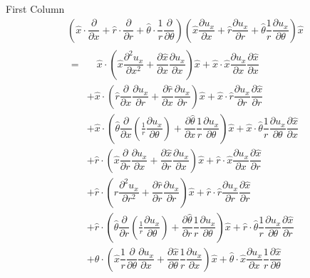 \documentclass{kthreport}
\begin{document}
First Column
\begin{eqnarray}
		\left(\hat{x}\cdot\dfrac{\partial}{\partial x} + \hat{r}\cdot\dfrac{\partial}{\partial r} + \hat{\theta}\cdot\dfrac{1}{r}\dfrac{\partial}{\partial \theta}\right)
	\left(	\hat{x}\dfrac{\partial u_{x}}{\partial x}  + \hat{r}\dfrac{\partial u_{x}}{\partial r} + \hat{\theta}\dfrac{1}{r}\dfrac{\partial u_{x}}{\partial \theta}
	\right) \hat{x} \nonumber \\
	\begin{split}
		= & \quad \hat{x}\cdot\left(\hat{x}\dfrac{\partial^{2}u_{x}}{\partial x^{2}} + \dfrac{\partial \hat{x}}{\partial x}\dfrac{\partial u_{x}}{\partial x}\right)\hat{x}  + \hat{x}\cdot\hat{x}\dfrac{\partial u_{x}}{\partial x}\dfrac{\partial \hat{x}}{\partial x}\\
		&+ \hat{x}\cdot\left(\hat{r}\dfrac{\partial }{\partial x}\dfrac{\partial u_{x}}{\partial r} + \dfrac{\partial \hat{r}}{\partial x}\dfrac{\partial u_{x}}{\partial r}\right)\hat{x} + \hat{x}\cdot\hat{r}\dfrac{\partial u_{x}}{\partial r}\dfrac{\partial \hat{x}}{\partial r} \\
		&+ \hat{x}\cdot\left(\hat{\theta}\dfrac{\partial }{\partial x}\left(\frac{1}{r}\dfrac{\partial u_{x}}{\partial \theta}\right) + \dfrac{\partial \hat{\theta}}{\partial x}\dfrac{1}{r}\dfrac{\partial u_{x}}{\partial \theta}				\right)\hat{x} + \hat{x}\cdot\hat{\theta}\dfrac{1}{r}\dfrac{\partial u_{x}}{\partial \theta}\dfrac{\partial \hat{x}}{\partial x}\\
		&+ \hat{r}\cdot\left(\hat{x}\dfrac{\partial }{\partial r}\dfrac{\partial u_{x}}{\partial x}	+ \dfrac{\partial \hat{x}}{\partial r}\dfrac{\partial u_{x}}{\partial x}	\right)\hat{x} + \hat{r}\cdot\hat{x}\dfrac{\partial u_{x}}{\partial x}\dfrac{\partial \hat{x}}{\partial r}\\
		&+ \hat{r}\cdot\left(\hat{r}\dfrac{\partial^{2}u_{x}}{\partial r^{2}} + \dfrac{\partial \hat{r}}{\partial r}\dfrac{\partial u_{x}}{\partial r}\right)\hat{x} + \hat{r}\cdot\hat{r}\dfrac{\partial u_{x}}{\partial r}\dfrac{\partial \hat{x}}{\partial r} \\
		&+ \hat{r}\cdot\left(\hat{\theta}\dfrac{\partial }{\partial r}\left(\frac{1}{r}\dfrac{\partial u_{x}}{\partial \theta}\right) + \dfrac{\partial \hat{\theta}}{\partial r}\dfrac{1}{r}\dfrac{\partial u_{x}}{\partial \theta} \right)\hat{x} + \hat{r}\cdot\hat{\theta}\dfrac{1}{r}\dfrac{\partial u_{x}}{\partial \theta}\dfrac{\partial \hat{x}}{\partial r} \\
		&+ \hat{\theta}\cdot\left(\hat{x}\dfrac{1}{r}\dfrac{\partial }{\partial \theta}\dfrac{\partial u_{x}}{\partial x}  + \dfrac{\partial \hat{x}}{\partial \theta}\dfrac{1}{r}\dfrac{\partial u_{x}}{\partial x} \right)\hat{x} + \hat{\theta}\cdot\hat{x}\dfrac{\partial u_{x}}{\partial x}\dfrac{1}{r}\dfrac{\partial \hat{x}}{\partial \theta} \\

\end{split}
\end{eqnarray}
\end{document}
